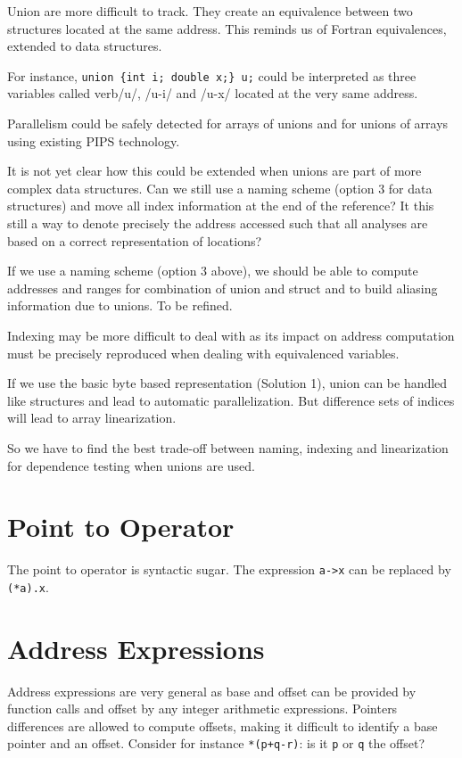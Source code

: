 \documentclass[a4paper]{report}
\begin{document}
Union are more difficult to track. They create an equivalence between
 two structures located at the same address. This reminds us of
 Fortran equivalences, extended to data structures.

For instance, \verb/union {int i; double x;} u;/ could be interpreted
 as three variables called verb/u/, /u-i/ and /u-x/ located at the very same
 address.

Parallelism could be safely detected for arrays of unions and for unions of
 arrays using existing PIPS technology.

It is not yet clear how this could be extended when unions are part of
 more complex data structures. Can we still use a naming scheme
 (option 3 for data structures) and move all index information at the
 end of the reference? It this still a way to denote precisely the
 address accessed such that all analyses are based on a correct
 representation of locations?

If we use a naming scheme (option 3 above), we should be able to
 compute addresses and ranges for combination of union and struct and
 to build aliasing information due to unions. To be refined.

Indexing may be more difficult to deal with as its impact on address
 computation must be precisely reproduced when dealing with
 equivalenced variables.

If we use the basic byte based representation (Solution 1), union can
 be handled like structures and lead to automatic parallelization. But
 difference sets of indices will lead to array linearization.

So we have to find the best trade-off between naming, indexing and
 linearization for dependence testing when unions are used.

\section{Point to Operator}

The point to operator is syntactic sugar. The expression \verb/a->x/
 can be replaced by \verb/(*a).x/.

\section{Address Expressions}

Address expressions are very general as base and offset can be
 provided by function calls and offset by any integer arithmetic
 expressions. Pointers differences are allowed to compute offsets,
 making it difficult to identify a base pointer and an
 offset. Consider for instance \verb/*(p+q-r)/: is it \verb/p/ or
 \verb/q/ the offset?
\end{document}
